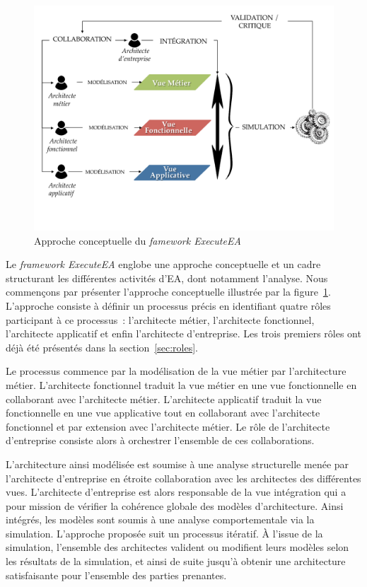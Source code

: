 \begin{figure}[!ht]
 \centering
 \includegraphics[trim= 0cm 2.5cm 0cm 0cm, clip, width=1\textwidth]{figures/4_demarche/approche_conceptuelle.pdf}
 \caption{Approche conceptuelle du \protect\emph{famework ExecuteEA}}
 \label{fig:approche_conceptuelle}
\end{figure}

Le \emph{framework ExecuteEA} englobe une approche conceptuelle et un cadre structurant les différentes activités d'EA, dont
notamment  l'analyse. Nous commençons par présenter l'approche conceptuelle illustrée par la figure~\ref{fig:approche_conceptuelle}.
L'approche consiste à définir un processus précis en identifiant
quatre rôles participant à ce processus~: l'architecte métier,
l'architecte fonctionnel, l'architecte applicatif et enfin l'architecte d'entreprise. Les trois premiers rôles ont déjà été présentés
dans la section~\ref{sec:roles}. 



Le processus commence par la modélisation de la vue métier par l'architecture
métier. L'architecte fonctionnel traduit la vue métier en une vue fonctionnelle 
en collaborant avec l'architecte
métier. L'architecte applicatif traduit la vue fonctionnelle en une vue applicative
tout en collaborant avec l'architecte fonctionnel et par extension avec l'architecte
métier. Le rôle de l'architecte d'entreprise consiste alors à orchestrer l'ensemble de ces
collaborations.

L'architecture ainsi modélisée est soumise à une analyse
structurelle menée par l'architecte d'entreprise en étroite collaboration avec
les architectes des différentes vues. L'architecte d'entreprise est alors
responsable de la vue intégration qui a pour mission de vérifier la cohérence
globale des modèles d'architecture. Ainsi intégrés, les modèles sont soumis à
une analyse comportementale via la simulation.
L'approche proposée suit un processus itératif. À l'issue de la simulation, l'ensemble des
architectes valident ou modifient leurs modèles selon les résultats de la simulation, et ainsi de
suite jusqu'à obtenir une architecture satisfaisante pour l'ensemble des parties prenantes.

